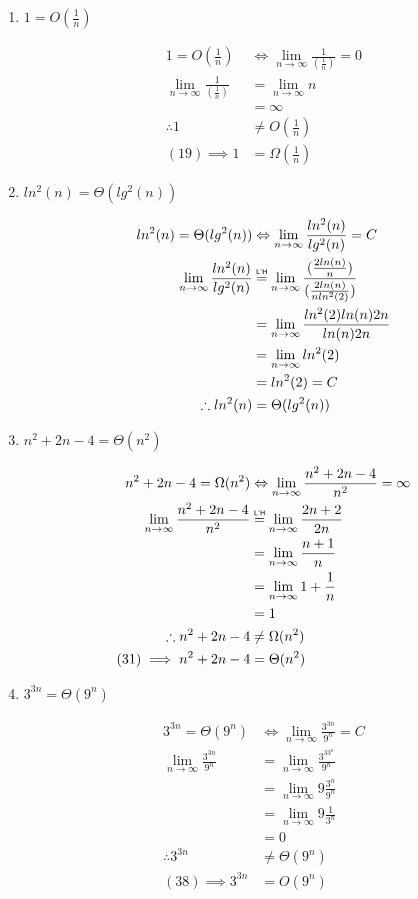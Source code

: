 \documentclass[12pt]{article}
\newcommand\lhop{\mathrel{\overset{\makebox[0pt]{\mbox{\normalfont\tiny\sffamily L'H}}}{=}}}
\newcommand\lmni{\lim_{n\to\infty}}
\begin{document}
\begin{enumerate}
\begin{enumerate}
		\item \textit{$1 = O(\frac{1}{n})$}
		
		\begin{align}
		 1 = O(\frac{1}{n}) & \Leftrightarrow \lmni \frac{1}{(\frac{1}{n})} = 0 \\
		 \lmni \frac{1}{(\frac{1}{n})} & = \lmni n \\
		 & = \infty \\
		 \therefore 1 & \neq O(\frac{1}{n}) \\
		 (19) \implies 1 & = \Omega(\frac{1}{n})
		\end{align}

		\pagebreak

		\item \textit{$ln^2(n) = \Theta(lg^2(n))$}
		
		\begin{align}
		 ln^2(n) = \Theta(lg^2(n)) & \Leftrightarrow \lmni \frac{ln^2(n)}{lg^2(n)} = C \\
		 \lmni \frac{ln^2(n)}{lg^2(n)} & \lhop \lmni \frac{(\frac{2ln(n)}{n})}{(\frac{2ln(n)}{nln^2(2)})} \\
		 & = \lmni \frac{ln^2(2)ln(n)2n}{ln(n)2n} \\
		 & = \lmni ln^2(2) \\
		 & = ln^2(2) = C\\
		 \therefore ln^2(n) & = \Theta(lg^2(n))
		\end{align}

		\item \textit{$n^2 + 2n - 4 = \Theta(n^2)$}
		
		\begin{align}
		 n^2 + 2n - 4 = \Omega(n^2) & \Leftrightarrow \lmni \frac{n^2 + 2n - 4}{n^2} = \infty \\
		 \lmni \frac{n^2 + 2n - 4}{n^2} & \lhop \lmni \frac{2n + 2}{2n} \\
		 & = \lmni \frac{n+1}{n} \\
		 & = \lmni 1 + \frac{1}{n} \\
		 & = 1\\
		 \therefore n^2 + 2n - 4 & \neq \Omega(n^2) \\
		 (31) \implies n^2 + 2n - 4 & = \Theta(n^2)
		\end{align}

		\pagebreak

		\item \textit{$3^{3n} = \Theta(9^n)$}
		
		\begin{align}
		 3^{3n} = \Theta(9^n) & \Leftrightarrow \lmni \frac{3^{3n}}{9^n} = C \\
		 \lmni \frac{3^{3n}}{9^n} & = \lmni \frac{3^33^n}{9^n} \\
		 & = \lmni 9\frac{3^n}{9^n} \\
		 & = \lmni 9\frac{1}{3^n} \\
		 & = 0\\
		 \therefore 3^{3n} & \neq \Theta(9^n) \\
		 (38) \implies 3^{3n} & = O(9^n)
		\end{align}


\end{enumerate}
\end{enumerate}
\end{document}
